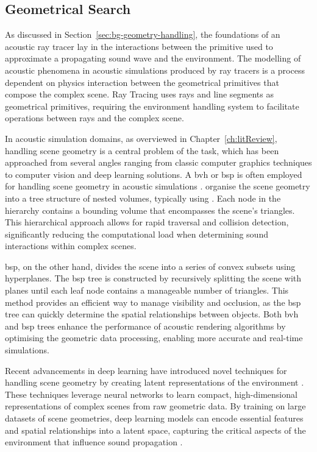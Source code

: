 \subsection{Geometrical Search}
As discussed in Section~\ref{sec:bg-geometry-handling}, the foundations of an acoustic ray tracer lay in the interactions between the primitive used to approximate a propagating sound wave and the environment. The modelling of acoustic phenomena in acoustic simulations produced by ray tracers is a process dependent on physics interaction between the geometrical primitives that compose the complex scene. Ray Tracing uses rays and line segments as geometrical primitives, requiring the environment handling system to facilitate operations between rays and the complex scene.\par
In acoustic simulation domains, as overviewed in Chapter~\ref{ch:litReview}, handling scene geometry is a central problem of the task, which has been approached from several angles ranging from classic computer graphics techniques to computer vision and deep learning solutions.
A \acrfull{bvh} or \acrfull{bsp} is often employed for handling scene geometry in acoustic simulations \citep{schroder2011physically}.  organise the scene geometry into a tree structure of nested volumes, typically using . Each node in the hierarchy contains a bounding volume that encompasses the scene's triangles. This hierarchical approach allows for rapid traversal and collision detection, significantly reducing the computational load when determining sound interactions within complex scenes.\par
\acrshort{bsp}, on the other hand, divides the scene into a series of convex subsets using hyperplanes. The \acrshort{bsp} tree is constructed by recursively splitting the scene with planes until each leaf node contains a manageable number of triangles. This method provides an efficient way to manage visibility and occlusion, as the \acrshort{bsp} tree can quickly determine the spatial relationships between objects. Both \acrshort{bvh} and \acrshort{bsp} trees enhance the performance of acoustic rendering algorithms by optimising the geometric data processing, enabling more accurate and real-time simulations.\par
Recent advancements in deep learning have introduced novel techniques for handling scene geometry by creating latent representations of the environment \citep{liang2023neural}. These techniques leverage neural networks to learn compact, high-dimensional representations of complex scenes from raw geometric data. By training on large datasets of scene geometries, deep learning models can encode essential features and spatial relationships into a latent space, capturing the critical aspects of the environment that influence sound propagation \citep{ratnarajah2022mesh2ir}.
